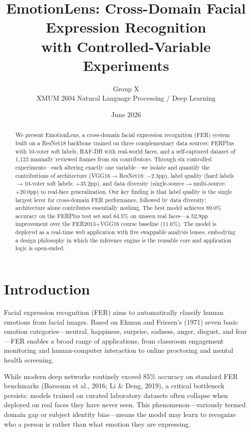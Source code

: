 \documentclass[12pt,a4paper]{article}
\title{\textbf{EmotionLens: Cross-Domain Facial Expression Recognition\\
with Controlled-Variable Experiments}}
\author{Group X \\ XMUM 2604 Natural Language Processing / Deep Learning}
\date{June 2026}
\begin{document}
\maketitle

\begin{abstract}
We present EmotionLens, a cross-domain facial expression recognition (FER) system built on a ResNet18 backbone trained on three complementary data sources: FERPlus with 10-voter soft labels, RAF-DB with real-world faces, and a self-captured dataset of 1,123 manually reviewed frames from six contributors. Through six controlled experiments---each altering exactly one variable---we isolate and quantify the contributions of architecture (VGG16$\to$ResNet18: $-$2.3pp), label quality (hard labels$\to$10-voter soft labels: +35.2pp), and data diversity (single-source$\to$multi-source: +20.0pp) to real-face generalization. Our key finding is that label quality is the single largest lever for cross-domain FER performance, followed by data diversity; architecture alone contributes essentially nothing. The best model achieves 89.0\% accuracy on the FERPlus test set and 64.5\% on unseen real faces---a 52.9pp improvement over the FER2013+VGG16 course baseline (11.6\%). The model is deployed as a real-time web application with five swappable analysis lenses, embodying a design philosophy in which the inference engine is the reusable core and application logic is open-ended.
\end{abstract}

\tableofcontents
\newpage

\section{Introduction}

Facial expression recognition (FER) aims to automatically classify human emotions from facial images. Based on Ekman and Friesen's (1971) seven basic emotion categories---neutral, happiness, surprise, sadness, anger, disgust, and fear---FER enables a broad range of applications, from classroom engagement monitoring and human-computer interaction to online proctoring and mental health screening.

While modern deep networks routinely exceed 85\% accuracy on standard FER benchmarks (Barsoum et al., 2016; Li \& Deng, 2019), a critical bottleneck persists: models trained on curated laboratory datasets often collapse when deployed on real faces they have never seen. This phenomenon---variously termed domain gap or subject identity bias---means the model may learn to recognize who a person is rather than what emotion they are expressing.
\end{document}
